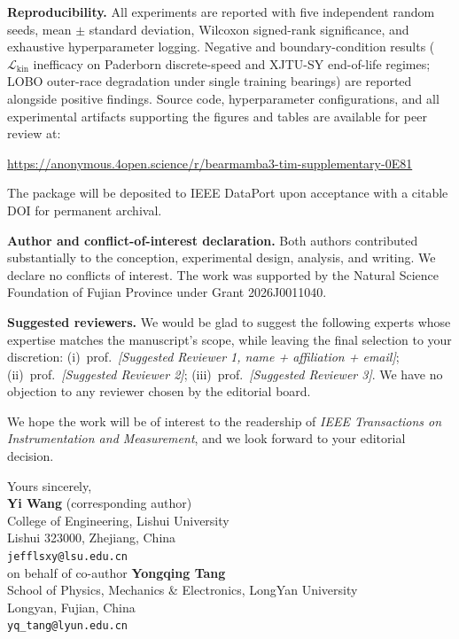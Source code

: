 \documentclass[11pt,a4paper]{article}
\begin{document}
\textbf{Reproducibility.} All experiments are reported with five
independent random seeds, mean $\pm$ standard deviation, Wilcoxon
signed-rank significance, and exhaustive hyperparameter logging.
Negative and boundary-condition results
($\mathcal{L}_{\text{kin}}$ inefficacy on Paderborn discrete-speed and
XJTU-SY end-of-life regimes; LOBO outer-race degradation under single
training bearings) are reported alongside positive findings.
Source code, hyperparameter configurations, and all experimental
artifacts supporting the figures and tables are available for peer
review at:
\par\medskip
\centerline{\url{https://anonymous.4open.science/r/bearmamba3-tim-supplementary-0E81}}
\par\medskip
The package will be deposited to IEEE DataPort upon acceptance with a
citable DOI for permanent archival.

\textbf{Author and conflict-of-interest declaration.} Both authors
contributed substantially to the conception, experimental design,
analysis, and writing. We declare no conflicts of interest. The work was
supported by the Natural Science Foundation of Fujian Province under
Grant 2026J0011040.

\textbf{Suggested reviewers.} We would be glad to suggest the following
experts whose expertise matches the manuscript's scope, while leaving
the final selection to your discretion: (i)~prof.\ \textit{[Suggested
Reviewer 1, name + affiliation + email]}; (ii)~prof.\ \textit{[Suggested
Reviewer 2]}; (iii)~prof.\ \textit{[Suggested Reviewer 3]}. We have no
objection to any reviewer chosen by the editorial board.

We hope the work will be of interest to the readership of \textit{IEEE
Transactions on Instrumentation and Measurement}, and we look forward to
your editorial decision.

\vspace{12pt}

Yours sincerely,\\[12pt]

\textbf{Yi Wang} (corresponding author)\\
College of Engineering, Lishui University\\
Lishui 323000, Zhejiang, China\\
\texttt{jefflsxy@lsu.edu.cn}\\[6pt]
on behalf of co-author \textbf{Yongqing Tang}\\
School of Physics, Mechanics \& Electronics, LongYan University\\
Longyan, Fujian, China\\
\texttt{yq\_tang@lyun.edu.cn}
\end{document}
